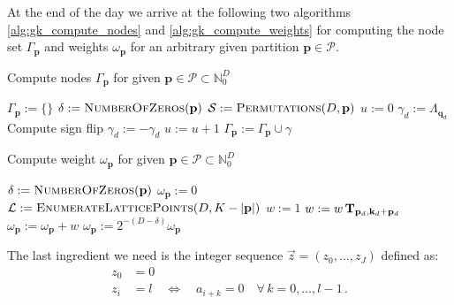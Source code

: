 \documentclass[a4paper,10pt]{article}
\begin{document}
At the end of the day we arrive at the following two algorithms
\eqref{alg:gk_compute_nodes} and \eqref{alg:gk_compute_weights}
for computing the node set $\Gamma_\mathbf{p}$ and weights $\omega_\mathbf{p}$
for an arbitrary given partition $\mathbf{p} \in \mathcal{P}$.

\begin{algorithm}[h!]
  \caption{Compute nodes $\Gamma_\mathbf{p}$ for given $\mathbf{p} \in \mathcal{P} \subset \mathbb{N}_0^D$}
  \label{alg:gk_compute_nodes}
  \begin{algorithmic}
      \State $\Gamma_\mathbf{p} := \{\}$
      \State $\delta := \textsc{NumberOfZeros}(\mathbf{p})$
      \State $\mathcal{S} := \textsc{Permutations}(D, \mathbf{p})$
          \State $u := 0$
            \State $\gamma_d := \Lambda_{\mathbf{q}_d}$
              \Comment Compute sign flip
                \State $\gamma_d := - \gamma_d$
              \EndIf
              \State $u := u + 1$
            \EndIf
          \EndFor
          \State $\Gamma_\mathbf{p} := \Gamma_\mathbf{p} \cup \gamma$
        \EndFor
      \EndFor
    \EndProcedure
  \end{algorithmic}
\end{algorithm}

\begin{algorithm}[h!]
  \caption{Compute weight $\omega_\mathbf{p}$ for given $\mathbf{p} \in \mathcal{P} \subset \mathbb{N}_0^D$}
  \label{alg:gk_compute_weights}
  \begin{algorithmic}
      \State $\delta := \textsc{NumberOfZeros}(\mathbf{p})$
      \State $\omega_\mathbf{p} := 0$
      \State $\mathcal{L} := \textsc{EnumerateLatticePoints}(D, K - |\mathbf{p}|)$
        \State $w := 1$
          \State $w := w \, \mathbf{T}_{\mathbf{p}_d, \mathbf{k}_d + \mathbf{p}_d}$
        \EndFor
        \State $\omega_\mathbf{p} := \omega_\mathbf{p} + w$
      \EndFor
      \State $\omega_\mathbf{p} := 2^{-(D-\delta)} \omega_\mathbf{p}$
    \EndProcedure
  \end{algorithmic}
\end{algorithm}

The last ingredient we need is the integer sequence $\vec{z} = (z_0, \ldots, z_J)$ defined as:
\begin{equation}
  \begin{split}
    z_0 & = 0 \\
    z_i & = l \quad \Leftrightarrow \quad a_{i+k} = 0 \quad \forall \, k = 0, \ldots, l-1 \,.
  \end{split}
\end{equation}
\end{document}
